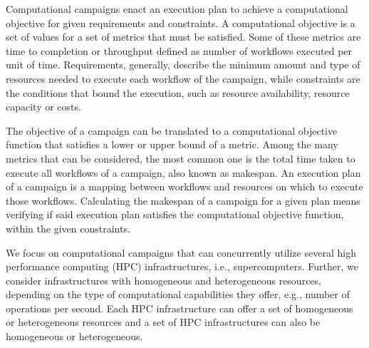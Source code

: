 \label{ch:campaigns}

Computational campaigns enact an execution plan to achieve a computational
objective for given requirements and constraints. A computational objective is a
set of values for a set of metrics that must be satisfied. Some of these metrics
are time to completion or throughput defined as number of workflows executed per
unit of time. Requirements, generally, describe the minimum amount and type of
resources needed to execute each workflow of the campaign, while constraints are
the conditions that bound the execution, such as resource availability, resource
capacity or costs.

The objective of a campaign can be translated to a computational objective
function that satisfies a lower or upper bound of a metric. Among the many
metrics that can be considered, the most common one is the total time taken to
execute all workflows of a campaign, also known as makespan. An execution plan
of a campaign is a mapping between workflows and resources on which to execute
those workflows. Calculating the makespan of a campaign for a given plan
means verifying if said execution plan satisfies the computational objective
function, within the given constraints.


We focus on computational campaigns that can concurrently utilize several high
performance computing (HPC) infrastructures, i.e., supercomputers. Further, we
consider infrastructures with homogeneous and heterogeneous resources, depending
on the type of computational capabilities they offer, e.g., number of operations
per second. Each HPC infrastructure can offer a set of homogeneous or
heterogeneous resources and a set of HPC infrastructures can also be homogeneous
or heterogeneous.

